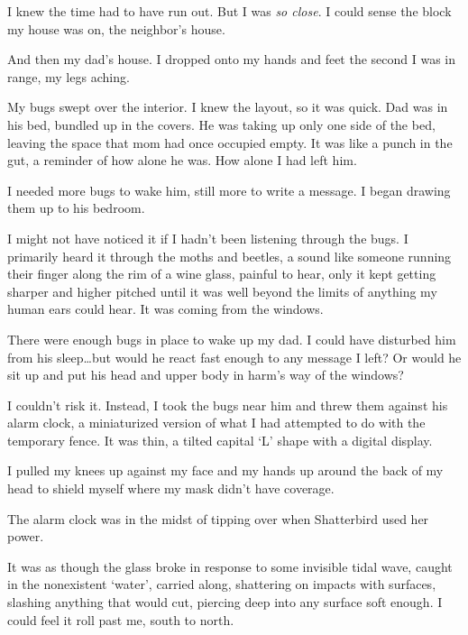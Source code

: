 I knew the time had to have run out.  But I was \emph{so close}.  I could sense the block my house was on, the neighbor's house.



And then my dad's house.  I dropped onto my hands and feet the second I was in range, my legs aching.



My bugs swept over the interior.  I knew the layout, so it was quick.  Dad was in his bed, bundled up in the covers.  He was taking up only one side of the bed, leaving the space that mom had once occupied empty.  It was like a punch in the gut, a reminder of how alone he was.  How alone I had left him.



I needed more bugs to wake him, still more to write a message.  I began drawing them up to his bedroom.



I might not have noticed it if I hadn't been listening through the bugs.  I primarily heard it through the moths and beetles, a sound like someone running their finger along the rim of a wine glass, painful to hear, only it kept getting sharper and higher pitched until it was well beyond the limits of anything my human ears could hear.  It was coming from the windows.



There were enough bugs in place to wake up my dad.  I could have disturbed him from his sleep\ldots but would he react fast enough to any message I left?  Or would he sit up and put his head and upper body in harm's way of the windows?



I couldn't risk it.  Instead, I took the bugs near him and threw them against his alarm clock, a miniaturized version of what I had attempted to do with the temporary fence.  It was thin, a tilted capital `L' shape with a digital display.



I pulled my knees up against my face and my hands up around the back of my head to shield myself where my mask didn't have coverage.



The alarm clock was in the midst of tipping over when Shatterbird used her power.



It was as though the glass broke in response to some invisible tidal wave, caught in the nonexistent `water', carried along, shattering on impacts with surfaces, slashing anything that would cut, piercing deep into any surface soft enough.  I could feel it roll past me, south to north.



